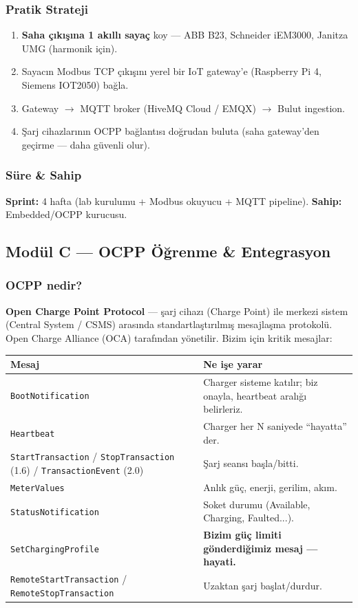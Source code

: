 \documentclass[11pt,a4paper]{article}
\begin{document}
\subsubsection{Pratik Strateji}
\begin{enumerate}
    \item \textbf{Saha çıkışına 1 akıllı sayaç} koy — ABB B23, Schneider iEM3000, Janitza UMG (harmonik için).
    \item Sayacın Modbus TCP çıkışını yerel bir IoT gateway'e (Raspberry Pi 4, Siemens IOT2050) bağla.
    \item Gateway $\rightarrow$ MQTT broker (HiveMQ Cloud / EMQX) $\rightarrow$ Bulut ingestion.
    \item Şarj cihazlarının OCPP bağlantısı doğrudan buluta (saha gateway'den geçirme — daha güvenli olur).
\end{enumerate}

\subsubsection{Süre \& Sahip}
\textbf{Sprint:} 4 hafta (lab kurulumu + Modbus okuyucu + MQTT pipeline). \textbf{Sahip:} Embedded/OCPP kurucusu.

\subsection{Modül C — OCPP Öğrenme \& Entegrasyon}

\subsubsection{OCPP nedir?}
\textbf{Open Charge Point Protocol} — şarj cihazı (Charge Point) ile merkezi sistem (Central System / CSMS) arasında standartlaştırılmış mesajlaşma protokolü. Open Charge Alliance (OCA) tarafından yönetilir. Bizim için kritik mesajlar:

\begin{tabularx}{\textwidth}{l X}
\toprule
\textbf{Mesaj} & \textbf{Ne işe yarar} \\
\midrule
\texttt{BootNotification} & Charger sisteme katılır; biz onayla, heartbeat aralığı belirleriz. \\
\texttt{Heartbeat} & Charger her N saniyede ``hayatta'' der. \\
\texttt{StartTransaction} / \texttt{StopTransaction} (1.6) / \texttt{TransactionEvent} (2.0) & Şarj seansı başla/bitti. \\
\texttt{MeterValues} & Anlık güç, enerji, gerilim, akım. \\
\texttt{StatusNotification} & Soket durumu (Available, Charging, Faulted...). \\
\texttt{SetChargingProfile} & \textbf{Bizim güç limiti gönderdiğimiz mesaj — hayati.} \\
\texttt{RemoteStartTransaction} / \texttt{RemoteStopTransaction} & Uzaktan şarj başlat/durdur. \\
\bottomrule
\end{tabularx}
\end{document}
